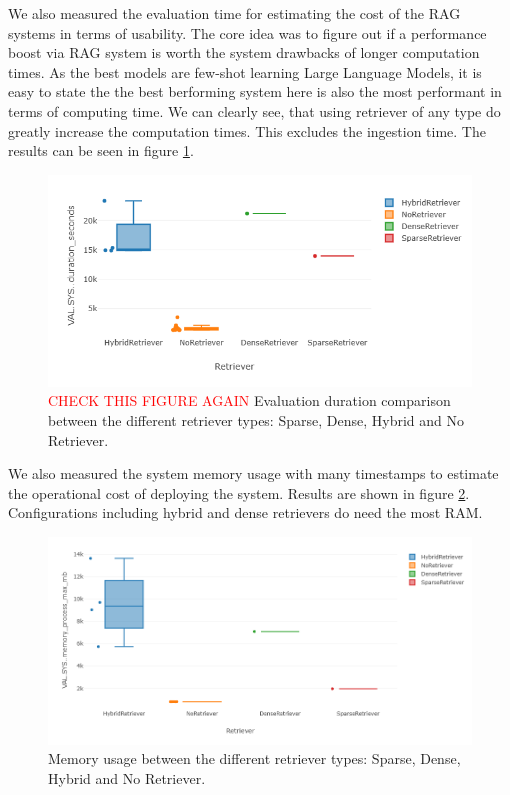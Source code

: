 We also measured the evaluation time for estimating the cost of the RAG systems in terms of usability. The core idea was to figure out if a performance boost via RAG system is worth the system drawbacks of longer computation times. As the best models are few-shot learning Large Language Models, it is easy to state the the best berforming system here is also the most performant in terms of computing time. We can clearly see, that using retriever of any type do greatly increase the computation times. This excludes the ingestion time. The results can be seen in figure \ref{fig:evaluation-time}.

\begin{figure}[!ht]
    \centering
    \includegraphics[width=\textwidth]{images/duration-retriever.png}
    \caption{\textcolor{red}{CHECK THIS FIGURE AGAIN} Evaluation duration comparison between the different retriever types: Sparse, Dense, Hybrid and No Retriever.}
    \label{fig:evaluation-time}
\end{figure}

We also measured the system memory usage with many timestamps to estimate the operational cost of deploying the system. Results are shown in figure \ref{fig:memory}. Configurations including hybrid and dense retrievers do need the most RAM. 

\begin{figure}[!ht]
    \centering
    \includegraphics[width=\textwidth]{images/Max MB RAM.png}
    \caption{Memory usage between the different retriever types: Sparse, Dense, Hybrid and No Retriever.}
    \label{fig:memory}
\end{figure}


